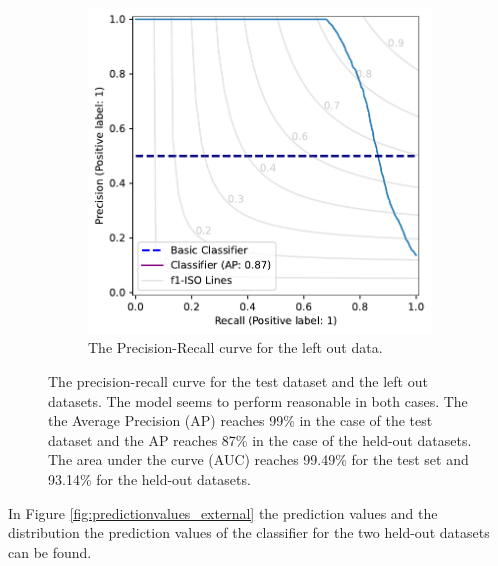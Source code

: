 \documentclass[a4paper, 12pt, oneside]{book} %
\begin{document}
\begin{figure} [htpb]
\begin{subfigure}[b]{0.48\textwidth}
         \includegraphics[width=\textwidth]{precision_recall_plot_extern.pdf}
         \caption{The Precision-Recall curve for the left out data.}
         \label{fig:precision_recall_curve_test_external}
     \end{subfigure}
     \caption[Precision recall curves for test and held-out datasets]{The precision-recall curve for the test dataset and the left out datasets. The model seems to perform reasonable in both cases. The the Average Precision (AP) reaches 99\% in the case of the test dataset and the AP reaches 87\% in the case of the held-out datasets. The area under the curve (AUC) reaches 99.49\% for the test set and 93.14\% for the held-out datasets.}
     \label{fig:precision-recall}
\end{figure}

In Figure \ref{fig:predictionvalues_external} the prediction values and the distribution the prediction values of the classifier for the two held-out datasets can be found.

\end{document}
